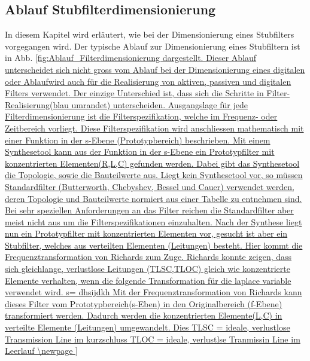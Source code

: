 \subsection{Ablauf Stubfilterdimensionierung}
In diesem Kapitel wird erläutert, wie bei der Dimensionierung eines Stubfilters  vorgegangen wird. Der typische Ablauf zur Dimensionierung eines Stubfiltern ist in Abb. \ref{fig:Ablauf_Filterdimensionierung dargestellt. Dieser Ablauf unterscheidet sich nicht gross vom Ablauf bei der Dimensionierung eines digitalen oder  Ablaufwird auch für die Realisierung von aktiven, passiven und digitalen Filters verwendet. Der einzige Unterschied ist, dass sich die Schritte in Filter-Realisierung(blau umrandet) unterscheiden.

Ausgangslage für jede Filterdimensionierung ist die Filterspezifikation, welche im Frequenz- oder Zeitbereich vorliegt. Diese Filterspezifikation wird anschliessen mathematisch mit einer Funktion in der s-Ebene (Prototypbereich) beschrieben. Mit einem Synthesetool kann aus der Funktion in der s-Ebene ein Prototypfilter mit konzentrierten Elementen(R,L,C) gefunden werden. Dabei gibt das Synthesetool die Topologie, sowie die Bauteilwerte aus. Liegt kein Synthesetool vor, so müssen Standardfilter (Butterworth, Chebyshev, Bessel und Cauer) verwendet werden, deren Topologie und Bauteilwerte normiert aus einer Tabelle zu entnehmen sind. Bei sehr speziellen Anforderungen an das Filter reichen die Standardfilter aber meist nicht aus um die Filterspezifikationen einzuhalten.

Nach der Synthese liegt nun ein Prototypfilter mit konzentrierten Elementen vor, gesucht ist aber ein Stubfilter, welches aus verteilten Elementen (Leitungen) besteht. Hier kommt die Frequenztransformation von Richards zum Zuge. Richards konnte zeigen, dass sich gleichlange, verlustlose Leitungen (TLSC,TLOC) gleich wie konzentrierte Elemente verhalten, wenn die folgende Transformation für die laplace variable verwendet wird.

s= dhsijdkh

Mit der Frequenztransformation von Richards kann dieses Filter vom Prototypbereich(s-Eben) in den Originalbereich (f-Ebene) transformiert werden. Dadurch werden die konzentrierten Elemente(L,C) in verteilte Elemente (Leitungen) umgewandelt. Dies 
TLSC = ideale, verlustlose Transmission Line im kurzschluss
TLOC = ideale, verlustlse Tranmissin Line im Leerlauf



\newpage

}
